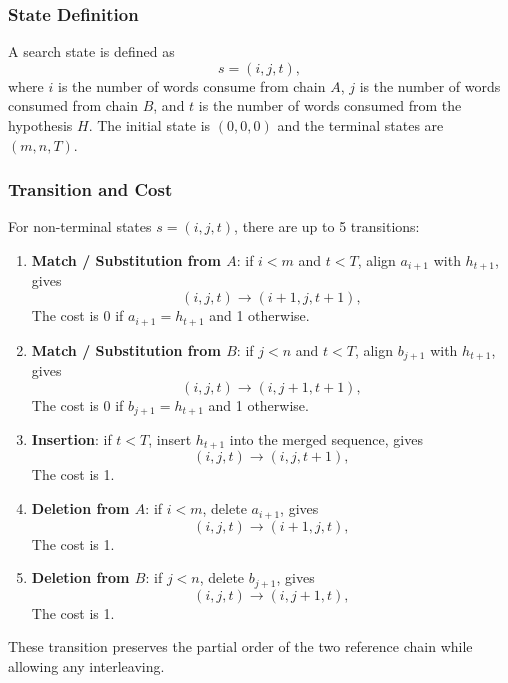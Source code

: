 \subsubsection{State Definition} 
A search state is defined as
\begin{equation}
s=(i,j,t),
\end{equation}
where $i$ is the number of words consume from chain $A$, $j$ is the number of words consumed from chain $B$, and $t$ is the number of words consumed from the hypothesis $H$. The initial state is $(0,0,0)$ and the terminal states are $(m,n,T)$.
\subsubsection{Transition and Cost}
For non-terminal states $s=(i,j,t)$, there are up to 5 transitions:
\begin{enumerate}
    \item \textbf{Match / Substitution from $A$}: if $i<m$ and $t<T$, align $a_{i+1}$ with $h_{t+1}$, gives
    \begin{equation}
        (i,j,t) \to (i+1,j,t+1),
    \end{equation}
    The cost is 0 if $a_{i+1}=h_{t+1}$ and 1 otherwise.
    \item \textbf{Match / Substitution from $B$}: if $j<n$ and $t<T$, align $b_{j+1}$ with $h_{t+1}$, gives
    \begin{equation}
        (i,j,t) \to (i,j+1,t+1),
    \end{equation}
    The cost is 0 if $b_{j+1}=h_{t+1}$ and 1 otherwise.
    \item \textbf{Insertion}: if $t<T$, insert $h_{t+1}$ into the merged sequence, gives
    \begin{equation}
        (i,j,t) \to (i,j,t+1),
    \end{equation}
    The cost is 1.
    \item \textbf{Deletion from $A$}: if $i<m$, delete $a_{i+1}$, gives
    \begin{equation}
        (i,j,t) \to (i+1,j,t),
    \end{equation}
    The cost is 1.
    \item \textbf{Deletion from $B$}: if $j<n$, delete $b_{j+1}$, gives
    \begin{equation}
        (i,j,t) \to (i,j+1,t),
    \end{equation}
    The cost is 1.
\end{enumerate}
These transition preserves the partial order of the two reference chain while allowing any interleaving.
